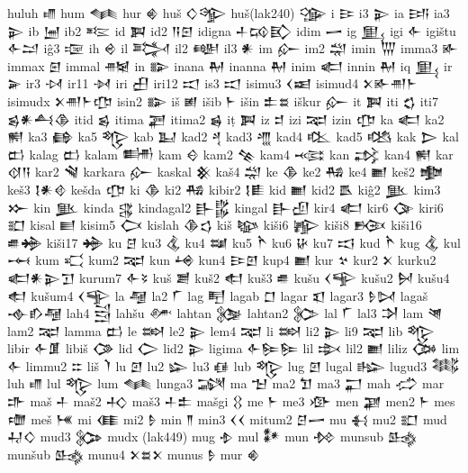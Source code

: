  huluh  𒈛   
 hum  𒈝   
 hur  𒄯   
 huš  𒄭𒄊    
 huš(lak240)  𒍽   
 i  𒄿   
 i3  𒉌   
 ia  𒅀   
 ia3  𒉌   
 ib  𒅁   
 ib2  𒌈   
 id  𒀉   
 id2  𒀀𒇉    
 idigna  𒈦𒄘𒃼    
 idim  𒅂   
 ig  𒅅   
 igi  𒅆   
 igištu  𒅆𒁺    
 iĝ3  𒉘   
 ih  𒄴   
 il  𒅋   
 il2  𒅍   
 il3  𒀭   
 im  𒅎   
 im2  𒁽   
 imin  𒅓   
 imma3  𒅊   
 immax  𒇋   
 immal  𒉥   
 in  𒅔   
 inana  𒈹   
 inanna  𒈹   
 inim  𒅗   
 innin  𒈹   
 iq  𒅅   
 ir  𒅕   
 ir3  𒀴   
 ir11  𒀵   
 iri  𒌷   
 iri12  𒀊   
 is3  𒀊   
 isimu3  𒌋𒀜    
 isimud4  𒉽𒅊𒉣𒈨    
 isimudx  𒉽𒉣𒈨𒂡    
 isin2  𒅔   
 iš  𒅖   
 išib  𒈨   
 išin  𒉺𒊺    
 iškur  𒅎   
 it  𒀉   
 iti  𒌚   
 iti7  𒌗𒀭𒋀𒆠    
 itid  𒌗   
 itima  𒃟   
 itima2  𒌖   
 iṭ  𒀉   
 iz  𒄑   
 izi  𒉈   
 izin  𒂡   
 ka  𒅗   
 ka2  𒆍   
 ka3  𒂵   
 ka5  𒈜   
 kab  𒆏   
 kad2  𒆐   
 kad3  𒆑   
 kad4  𒆒   
 kad5  𒆓   
 kak  𒆕   
 kal  𒆗   
 kalag  𒆗   
 kalam  𒌦   
 kam  𒄰   
 kam2  𒆚   
 kam4  𒆛   
 kan  𒃶   
 kan4  𒆍   
 kar  𒋼𒀀    
 kar2  𒃸   
 karkara  𒅎   
 kaskal  𒆜   
 kaš4  𒁽   
 ke  𒆠   
 ke2  𒄀   
 ke4  𒆤   
 keš2  𒆟   
 keš3  𒋙𒀭𒄲    
 kešda  𒂡   
 ki  𒆠   
 ki2  𒄀   
 kibir2  𒋙𒀾    
 kid  𒆤   
 kid2  𒋺   
 kiĝ2  𒆥   
 kim3  𒁍   
 kin  𒆥   
 kinda  𒃱   
 kindagal2  𒃲𒌵    
 kingal  𒃲𒌺    
 kir4  𒅗   
 kir6  𒀘   
 kiri6  𒊬   
 kisal  𒆦   
 kisim5  𒆨   
 kislah  𒆠𒌓    
 kiš  𒆧   
 kiši6  𒊾   
 kiši8  𒁞   
 kiši16  𒌑𒄉    
 kiši17  𒄉   
 ku  𒆪   
 ku3  𒆬   
 ku4  𒆭   
 ku5  𒋻   
 ku6  𒄩   
 ku7  𒆯   
 kud  𒋻   
 kug  𒆬   
 kul  𒆰   
 kum  𒄣   
 kum2  𒉈   
 kun  𒆲   
 kun4  𒄿𒇻    
 kup4  𒆤   
 kur  𒆳   
 kur2  𒉽   
 kurku2  𒅗𒀭𒉌𒋛    
 kurum7  𒅆𒂟    
 kuš  𒋢   
 kuš2  𒊨   
 kuš3  𒌑   
 kušu  𒌋𒊊    
 kušu2  𒆵   
 kušu4  𒊨   
 kušum4  𒌋𒊊    
 la  𒆷   
 la2  𒇲   
 lag  𒋃   
 lagab  𒆸   
 lagar  𒇬   
 lagar3  𒊩𒄸    
 lagaš  𒉢𒁓𒆷    
 lah4  𒁻   
 lahšu  𒇱   
 lahtan  𒉴   
 lahtan2  𒉶   
 lal  𒇲   
 lal3  𒋭   
 lam  𒇴   
 lam2  𒉈   
 lamma  𒆗   
 le  𒇷   
 le2  𒉌   
 lem4  𒉈   
 li  𒇷   
 li2  𒉌   
 li9  𒉈   
 lib  𒈜   
 libir  𒅆𒂠    
 libiš  𒀚   
 lid  𒀖   
 lid2  𒉌   
 ligima  𒅆𒌉𒌉    
 lil  𒇸   
 lil2  𒆤   
 liliz  𒀗   
 lim  𒅆   
 limmu2  𒇹   
 liš  𒇺   
 lu  𒇻   
 lu2  𒇽   
 lu3  𒈖   
 lub  𒈜   
 lug  𒇻   
 lugal  𒈗   
 lugud3  𒈟   
 luh  𒈛   
 lul  𒈜   
 lum  𒈝   
 lunga3  𒋋   
 ma  𒈠   
 ma2  𒈣   
 ma3  𒂷   
 mah  𒈤   
 mar  𒈥   
 maš  𒈦   
 maš2  𒈧   
 maš3  𒈦𒉺    
 mašgi  𒌐   
 me  𒈨   
 me3  𒀞   
 men  𒃞   
 men2  𒈨   
 mes  𒈩   
 meš  𒎌   
 mi  𒈪   
 mi2  𒊩   
 min  𒈫   
 min3  𒌋𒌋    
 mitum2  𒆪𒅂    
 mu  𒈬   
 mu2  𒊬   
 mud  𒄷𒄭    
 mud3  𒉯   
 mudx  (lak449)   
 mug  𒈮   
 mul  𒀯   
 mun  𒁵   
 munsub  𒈰   
 munšub  𒈰   
 munu4  𒉽𒊺𒉽    
 munus  𒊩   
 mur  𒄯   
